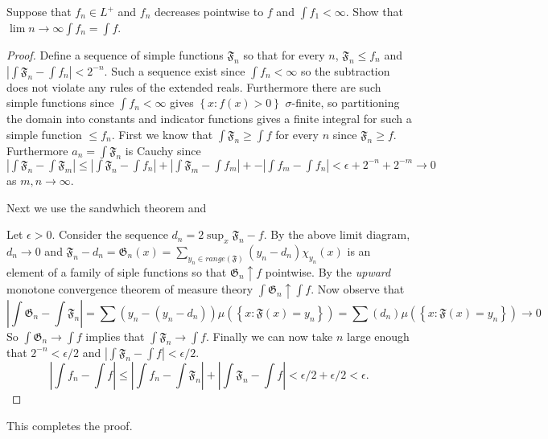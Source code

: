 \documentclass[11pt]{amsart}
\theoremstyle{definition}
\numberwithin{theorem}{section}
\numberwithin{definition}{section}
\numberwithin{equation}{section}
\newcommand{\set}[1]{ \left\{ #1 \right\} }
\begin{document}
  \medskip {} Suppose that $f_n \in L^+$ and $f_n$ decreases pointwise to $f$ and $\int f_1 < \infty$. Show that $\lim{n \to \infty} \int f_n = \int f$.
  \begin{proof} 
  Define a sequence of simple functions $\mathfrak{F}_n$ so that  for every $n$,  $\mathfrak{F}_n \leq f_n$ and $|\int \mathfrak{F}_n - \int f_n| <2^{-n}$.  Such a sequence exist since $\int f_n < \infty$ so the subtraction does not violate any rules of the extended reals. Furthermore there are such simple functions since $\int f_n < \infty$ gives $\set{x: f(x) > 0}$ $\sigma$-finite, so partitioning the domain into constants and indicator functions gives a finite integral for such a simple function $\leq f_n$. First we know that $\int \mathfrak{F}_n \geq \int f$ for every $n$ since $\mathfrak{F}_n \geq f$. Furthermore $a_n = \int \mathfrak{F}_n$ is Cauchy since $|\int \mathfrak{F}_n - \int \mathfrak{F}_m| \leq |\int \mathfrak{F}_n - \int f_n| + |\int \mathfrak{F}_m - \int f_m| + - |\int f_m - \int f_n| < \epsilon  + 2^{-n} +2^{-m} \to 0$ as $m,n \to \infty$.

    Next we use the sandwhich theorem and
    \begin{center}
     \end{center}   
    Let $\epsilon > 0$. Consider the sequence $d_n = 2\sup_x \mathfrak{F}_n - f$. By the above limit diagram, $d_n \to 0$ and $\mathfrak{F}_n - d_n = \mathfrak{G}_n(x) = \sum_{y_n \in range(\mathfrak{F})} (y_n - d_n)\chi_{y_n}(x)$ is an element of a family of siple functions so that $\mathfrak{G}_n \uparrow f$ pointwise. By the \emph{upward} monotone convergence theorem of measure theory $\int \mathfrak{G}_n \uparrow \int f$. Now observe that
    \begin{equation*}
      \left|\int \mathfrak{G}_n - \int \mathfrak{F}_n\right| = \sum\left(y_n - (y_n - d_n)\right)\mu(\set{x:\mathfrak{F}(x) = y_n}) = \sum\left(d_n\right)\mu(\set{x:\mathfrak{F}(x) = y_n}) \to 0
    \end{equation*}
    So $\int \mathfrak{G}_n \to \int f$ implies that $\int \mathfrak{F}_n \to \int f$. Finally we can now take $n$ large enough that $2^{-n} < \epsilon/2$ and $\left|\int \mathfrak{F}_n - \int f\right| < \epsilon/2$.
    \begin{equation*}
      \left|\int f_n - \int f\right| \leq \left|\int f_n - \int \mathfrak{F}_n\right| + \left|\int \mathfrak{F}_n - \int f\right| < \epsilon/2 + \epsilon/2  < \epsilon.
    \end{equation*}
  \end{proof}
  This completes the proof.
\end{document}

